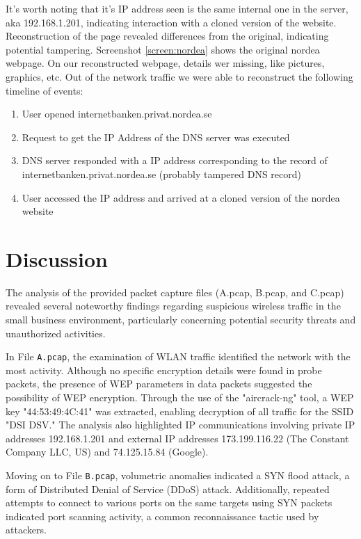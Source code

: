 \noindent It’s worth noting that it’s IP address seen is the same internal one in the server, aka 192.168.1.201, indicating interaction with a cloned version of the website. Reconstruction of the page revealed differences from the original, indicating potential tampering. Screenshot \ref{screen:nordea} shows the original nordea webpage. On our reconstructed webpage, details wer missing, like pictures, graphics, etc. Out of the network traffic we were able to reconstruct the following timeline of events:
\begin{enumerate}
	\item User opened internetbanken.privat.nordea.se
	\item Request to get the IP Address of the DNS server was executed
	\item DNS server responded with a IP address corresponding to the record of \\internetbanken.privat.nordea.se (probably tampered DNS record)
	\item User accessed the IP address and arrived at a cloned version of the nordea website 
\end{enumerate}

\section{Discussion}
The analysis of the provided packet capture files (A.pcap, B.pcap, and C.pcap) revealed several noteworthy findings regarding suspicious wireless traffic in the small business environment, particularly concerning potential security threats and unauthorized activities.
\newline

\noindent In File \texttt{A.pcap}, the examination of WLAN traffic identified the network with the most activity. Although no specific encryption details were found in probe packets, the presence of WEP parameters in data packets suggested the possibility of WEP encryption. Through the use of the "aircrack-ng" tool, a WEP key "44:53:49:4C:41" was extracted, enabling decryption of all traffic for the SSID "DSI DSV." The analysis also highlighted IP communications involving private IP addresses 192.168.1.201 and external IP addresses 173.199.116.22 (The Constant Company LLC, US) and 74.125.15.84 (Google).
\newline

\noindent Moving on to File \texttt{B.pcap}, volumetric anomalies indicated a SYN flood attack, a form of Distributed Denial of Service (DDoS) attack. Additionally, repeated attempts to connect to various ports on the same targets using SYN packets indicated port scanning activity, a common reconnaissance tactic used by attackers.
\newline

